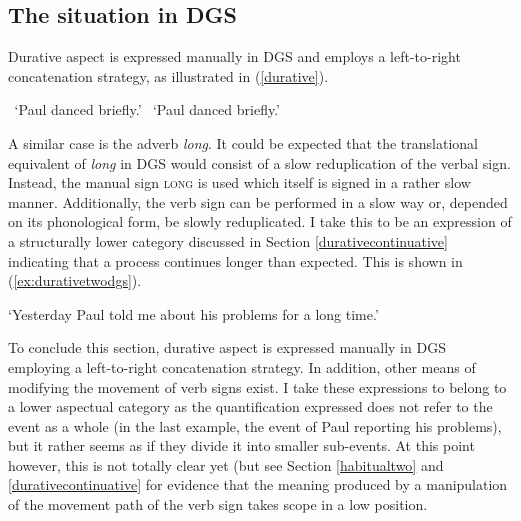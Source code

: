 \subsection{The situation in DGS}
Durative aspect is expressed manually in DGS and employs a left-to-right concatenation strategy, as illustrated in (\ref{durative}).

\begin{exe}
\ex\label{durative}\begin{xlist} 
\glt \textcolor{white}{?}`Paul danced briefly.' \label{ex:durativea}
\glt \textcolor{white}{?}`Paul danced briefly.' \label{ex:durativeb}
\end{xlist}
\end{exe} 

\noindent A similar case is the adverb \textit{long}. It could be expected that the translational equivalent of \textit{long} in DGS would consist of a slow reduplication of the verbal sign. Instead, the manual sign \textsc{long} is used which itself is signed in a rather slow manner. Additionally, the verb sign can be performed in a slow way or, depended on its phonological form, be slowly reduplicated. I take this to be an expression of a structurally lower category discussed in Section \ref{durativecontinuative} indicating that a process continues longer than expected. This is shown in (\ref{ex:durativetwodgs}).


\begin{exe}
\glt `Yesterday Paul told me about his problems for a long time.' \label{ex:durativetwodgs}
\end{exe} 

\noindent To conclude this section, durative aspect is expressed manually in DGS employing a left-to-right concatenation strategy. In addition, other means of modifying the movement of verb signs exist. I take these expressions to belong to a lower aspectual category as the quantification expressed does not refer to the event as a whole (in the last example, the event of Paul reporting his problems), but it rather seems as if they divide it into smaller sub-events. At this point however, this is not totally clear yet (but see Section \ref{habitualtwo} and \ref{durativecontinuative} for evidence that the meaning produced by a manipulation of the movement path of the verb sign takes scope in a low position.

